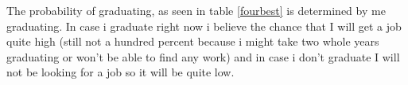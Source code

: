 \documentclass[12pt]{article} %
\begin{document}
\begin{table}
    \centering
\end{table}

The probability of graduating, as seen in table \ref{fourbest} is determined by
me graduating. In case i graduate right now i believe the chance that I will get
a job quite high (still not a hundred percent because i might take two whole years
graduating or won't be able to find any work) and in case i don't graduate I will not be
looking for a job so it will be quite low.
\end{document}
